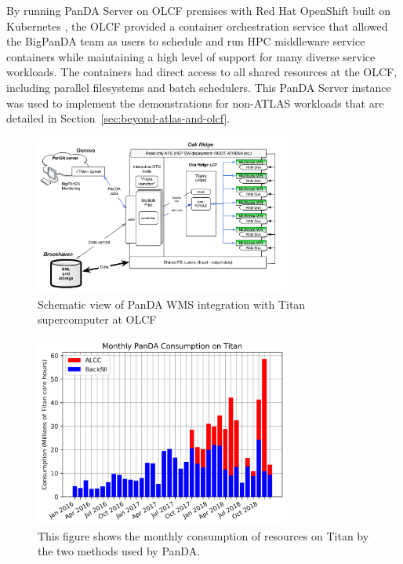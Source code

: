 By running PanDA Server on OLCF premises with Red Hat OpenShift built on
Kubernetes \cite{Kubernetes}, the OLCF provided a container orchestration
service that allowed the BigPanDA team as users to schedule and run HPC
middleware service containers while maintaining a high level of support for
many diverse service workloads. The containers had direct access to all shared
resources at the OLCF, including parallel filesystems and batch schedulers.
This PanDA Server instance was used to implement the demonstrations for
non-ATLAS workloads that are detailed in
Section~\ref{sec:beyond-atlas-and-olcf}.


\begin{figure}
  \includegraphics[width=0.75\textwidth]{images/Figure_5.png}
\caption{Schematic view of PanDA WMS integration with Titan supercomputer at OLCF}
\label{fig:implementation}
\end{figure}


\begin{figure}
  \includegraphics[width=0.75\textwidth]{images/monthly-consumption.png}
\caption{This figure shows the monthly consumption of resources on Titan by the
two methods used by PanDA.}
\label{fig:monthly-consumption}
\end{figure}

